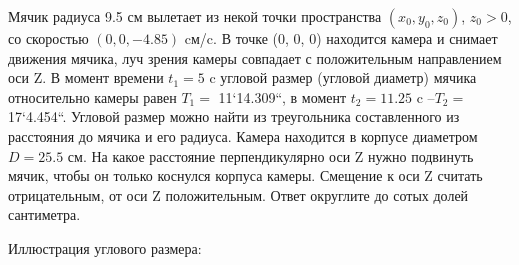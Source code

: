 
Мячик радиуса 9.5 см вылетает из некой точки пространства $(x_0, y_0, z_0)$, $ z_0 > 0 $, 
со скоростью \linebreak $(0, 0, -4.85)$ cм/c. В точке (0, 0, 0) находится камера и снимает движения мячика, 
луч зрения камеры совпадает с положительным направлением оси Z. В момент времени $t_1 = 5$ c 
угловой размер (угловой диаметр) мячика относительно камеры равен $T_1=$ 11`14.309``, в 
момент $t_2=11.25$ c –$T_2=$17`4.454``. Угловой размер можно найти из треугольника 
составленного из расстояния до мячика и его радиуса. Камера находится в корпусе диаметром $D = 25.5$ см. 
На какое расстояние перпендикулярно оси Z нужно подвинуть мячик, чтобы он только коснулся корпуса камеры. 
Смещение к оси Z считать отрицательным, от оси Z положительным. 
Ответ округлите до сотых долей сантиметра.


Иллюстрация углового размера:


